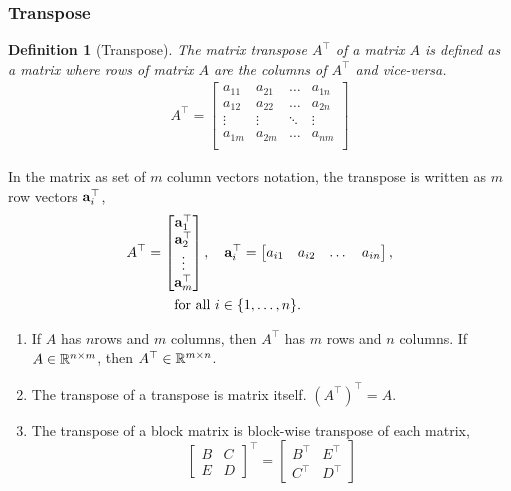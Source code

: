 \documentclass[twocolumn]{article}
\newtheorem{defn}{Definition}
\begin{document}
\subsubsection{Transpose}
\begin{defn}[Transpose]
  The matrix transpose $A^\top$ of a matrix $A$ is defined as a matrix where
  rows of matrix $A$ are the columns  of $A^\top$ and vice-versa.
  \begin{align}
    A^\top  =  \begin{bmatrix}
      a_{11}  &  a_{21} &   \dots &  a_{1n} \\
      a_{12}  &  a_{22} &   \dots &  a_{2n} \\
      \vdots  & \vdots &   \ddots  &  \vdots   \\
      a_{1m}  &  a_{2m} &   \dots &  a_{nm} \\
    \end{bmatrix}
  \end{align}
\end{defn}

In  the matrix as set of  $m$ column  vectors notation, the transpose is written as $m$
row  vectors $\mathbf{a}_i^\top$,
%
\begin{align}
  A^\top  &=  \begin{bmatrix}
    \mathbf{a}_1^\top \\ \mathbf{a}_2^\top \\ \vdots \\  \mathbf{a}_m^\top
  \end{bmatrix},
  \quad
  \mathbf{a}_i^\top = \begin{bmatrix}
    a_{i1}  & a_{i2}  &   \dots &  a_{in}
  \end{bmatrix},
                                  \notag \\
  &\qquad \text{for all } i \in \{1, \dots, n\}.
\end{align}
%

\begin{enumerate}
\item  If $A$ has $n$rows and  $m$  columns, then  $A^\top$  has $m$ rows and
  $n$  columns. If  $A \in \mathbb{R}^{n \times  m}$, then  $A^\top \in \mathbb{R}^{m
    \times n}$.
  \item  The transpose  of  a transpose is matrix itself. $(A^\top)^\top = A$.
  \item  The transpose of a block matrix is  block-wise  transpose  of  each
    matrix,
    \[
    \begin{bmatrix}
      B  &   C \\
      E & D
    \end{bmatrix}^\top
    = 
    \begin{bmatrix}
      B^\top  & E^\top \\
      C^\top & D^\top
    \end{bmatrix}
    \]
    
\end{enumerate}
\end{document}
